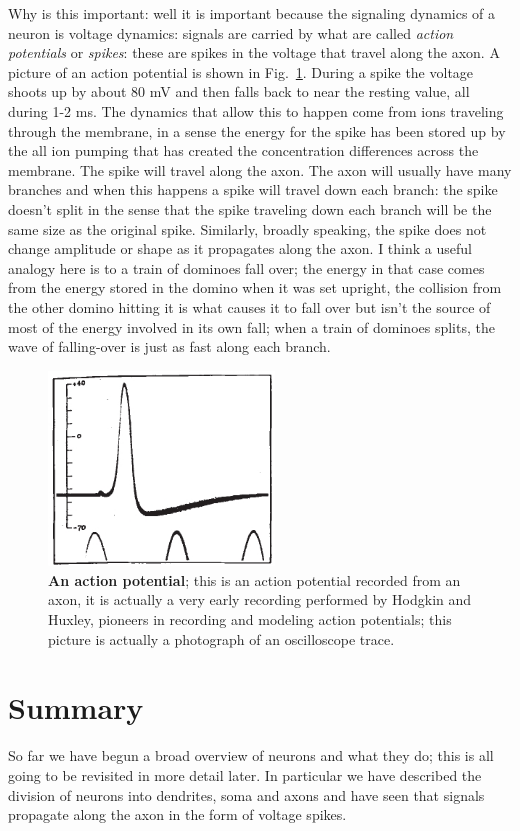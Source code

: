 \documentclass[12pt]{article}
\begin{document}
Why is this important: well it is important because the signaling
dynamics of a neuron is voltage dynamics: signals are carried by what
are called \textsl{action potentials} or \textsl{spikes}: these are
spikes in the voltage that travel along the axon. A picture of an
action potential is shown in Fig.~\ref{fig_hh}. During a spike the
voltage shoots up by about 80 mV and then falls back to near the
resting value, all during 1-2 ms. The dynamics that allow this to
happen come from ions traveling through the membrane, in a sense the
energy for the spike has been stored up by the all ion pumping that
has created the concentration differences across the membrane. The
spike will travel along the axon. The axon will usually have many
branches and when this happens a spike will travel down each branch:
the spike doesn't split in the sense that the spike traveling down
each branch will be the same size as the original spike. Similarly,
broadly speaking, the spike does not change amplitude or shape as it
propagates along the axon. I think a useful analogy here is to a train
of dominoes fall over; the energy in that case comes from the energy
stored in the domino when it was set upright, the collision from the
other domino hitting it is what causes it to fall over but isn't the
source of most of the energy involved in its own fall; when a train of
dominoes splits, the wave of falling-over is just as fast along each
branch.


\begin{figure}[tbhp]
  \begin{center}
  \includegraphics[width=6cm]{action_potential.jpg}
\end{center}
  \caption{\textbf{An action potential}; this is an action potential
    recorded from an axon, it is actually a very early recording
    performed by Hodgkin and Huxley, pioneers in recording and
    modeling action potentials; this picture is actually a photograph
    of an oscilloscope trace. \label{fig_hh}}
\end{figure}

\section{Summary}

So far we have begun a broad overview of neurons and what they do;
this is all going to be revisited in more detail later. In particular
we have described the division of neurons into dendrites, soma and
axons and have seen that signals propagate along the axon in the form
of voltage spikes.
\end{document}
